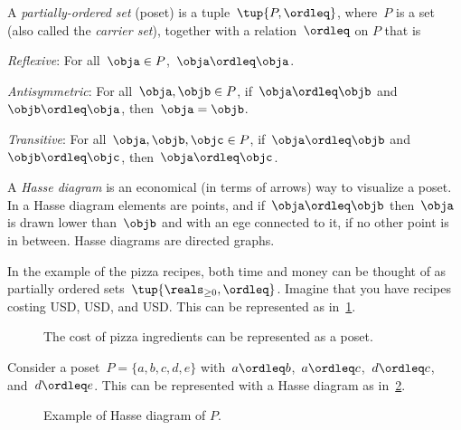 

\begin{definition}
  \label{def:poset}
  A \emph{partially-ordered set} (poset) is a tuple~$\tup{P, \ordleq}$,
  where~$P$ is a set (also called the \emph{carrier set}), together with a
  relation~$\ordleq$ on $P$ that is
  \begin{compactenum}
    \item \emph{Reflexive}: For all~$\obja\in P$,~$\obja \ordleq \obja$.
    \item \emph{Antisymmetric}: For all~$\obja,\objb\in P$, if~$\obja\ordleq \objb$ and~$\objb\ordleq \obja$, then~$\obja=\objb$.
    \item \emph{Transitive}: For all~$\obja,\objb,\objc\in P$, if~$\obja\ordleq \objb$ and~$\objb\ordleq \objc$, then~$\obja\ordleq \objc$.
  \end{compactenum}
\end{definition}

A \emph{Hasse diagram} is an economical (in terms of arrows) way to visualize a poset. In a Hasse diagram elements are points, and if~$\obja \ordleq \objb$ then~$\obja$ is drawn lower than~$\objb$ and with an ege connected to it, if no other point is in between. Hasse diagrams are directed graphs.

In the example of the pizza recipes, both time and money can be thought of as partially ordered sets~$\tup{\reals_{\geq 0},\ordleq}$. Imagine that you have recipes costing \unit[1]{USD}, \unit[2]{USD}, and \unit[3]{USD}. This can be represented as in~\cref{fig:hassepizza}.

\begin{figure}[h!]
  \begin{center}
    \caption{The cost of pizza ingredients can be represented as a poset.\label{fig:hassepizza}}
  \end{center}
\end{figure}


\begin{example}
  Consider a poset~$P=\{a,b,c,d,e\}$ with~$a\ordleq b$,~$a\ordleq c$,~$d\ordleq c$, and~$d\ordleq e$. This can be represented with a Hasse diagram as in~\cref{fig:hasse}.
\end{example}

\begin{figure}[h!]
  \centering
  \caption{Example of Hasse diagram of $P$. \label{fig:hasse}}
\end{figure}

